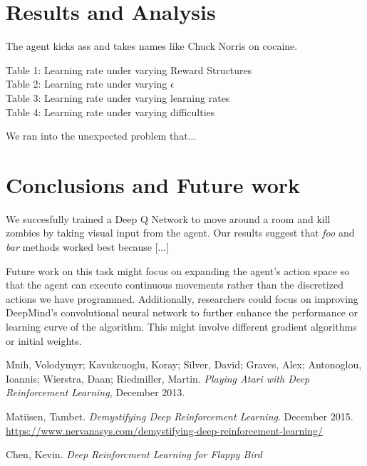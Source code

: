 \documentclass{article}
\begin{document}
\begin{multicols}{2}
\section{Results and Analysis}

The agent kicks ass and takes names like Chuck Norris on cocaine.

\begin{description}
    \item[Table 1: Learning rate under varying Reward Structures]
    \item[Table 2: Learning rate under varying $\epsilon$]
    \item[Table 3: Learning rate under varying learning rates]
    \item[Table 4: Learning rate under varying difficulties]
\end{description}

We ran into the unexpected problem that...





\section{Conclusions and Future work}
We succesfully trained a Deep Q Network to move around a room and kill zombies by taking visual input from the agent.
Our results suggest that \emph{foo} and \emph{bar} methods worked best because [...]

Future work on this task might focus on expanding the agent's action space so that the agent can execute continuous movements rather than the discretized actions we have programmed.
Additionally, researchers could focus on improving DeepMind's convolutional neural network to further enhance the performance or learning curve of the algorithm.
This might involve different gradient algorithms or initial weights.

\end{multicols}



\pagebreak
\begin{thebibliography}{9}


Mnih, Volodymyr; Kavukcuoglu, Koray; Silver, David; Graves, Alex; Antonoglou, Ioannis; Wierstra, Daan; Riedmiller, Martin.
\emph{Playing Atari with Deep Reinforcement Learning},
December 2013.

Matiisen, Tambet.
\emph{Demystifying Deep Reinforcement Learning}. December 2015.
\url{https://www.nervanasys.com/demystifying-deep-reinforcement-learning/}

Chen, Kevin.
\emph{Deep Reinforcment Learning for Flappy Bird}


\end{thebibliography}
\end{document}
